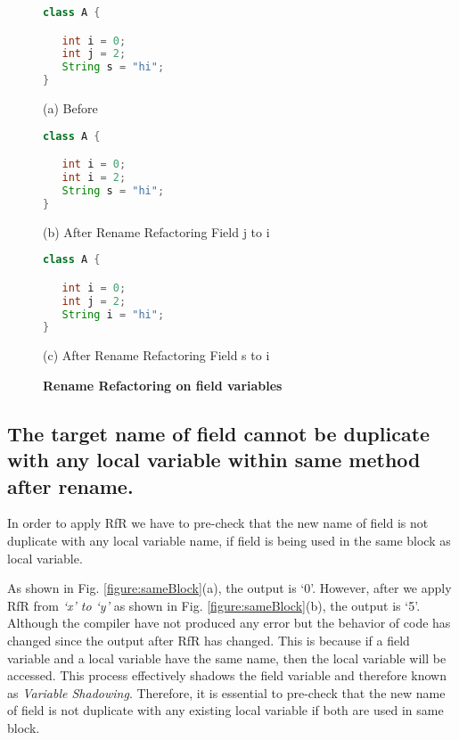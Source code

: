\begin{figure}[th]
\centering	
\begin{minipage}[t]{0.45\linewidth}
\begin{lstlisting}[language=java, basicstyle=\scriptsize\ttfamily,frame=single]
class A {

   int i = 0;
   int j = 2;
   String s = "hi";
}

\end{lstlisting}
\centering(a) Before
\end{minipage}
\hfill
\begin{minipage}[t]{0.45\linewidth}
\begin{lstlisting}[language=java, basicstyle=\scriptsize\ttfamily,frame=single]
class A {

   int i = 0;
   int i = 2;
   String s = "hi";
}
\end{lstlisting}
\centering(b) After Rename Refactoring Field j to i
\end{minipage}

\centering
\begin{minipage}[t]{0.45\linewidth}
\begin{lstlisting}[language=java, basicstyle=\scriptsize\ttfamily,frame=single]
class A {

   int i = 0;
   int j = 2;
   String i = "hi";
}
\end{lstlisting}
\centering(c) After Rename Refactoring Field s to i
\end{minipage}
\caption{\textbf{Rename Refactoring on field variables}}
\label{figure:field}
\end{figure}


\subsection{The target name of field cannot be duplicate with any local variable within same method after rename.}
In order to apply RfR we have to pre-check that the new name of field is not duplicate with any local variable name, if field is being used in the same block as local variable. 

As shown in Fig. \ref{figure:sameBlock}(a), the output is `0'. However, after we apply RfR from \emph{`x' to `y'} as shown in Fig. \ref{figure:sameBlock}(b), the output is `5'. Although the compiler have not produced any error but the behavior of code has changed since the output after RfR has changed. This is because if a field variable and a local variable have the same name, then the local variable will be accessed. This process effectively shadows the field variable and therefore known as \textit{Variable Shadowing}. Therefore, it is essential to pre-check that the new name of field is not duplicate with any existing local variable if both are used in same block.
 

